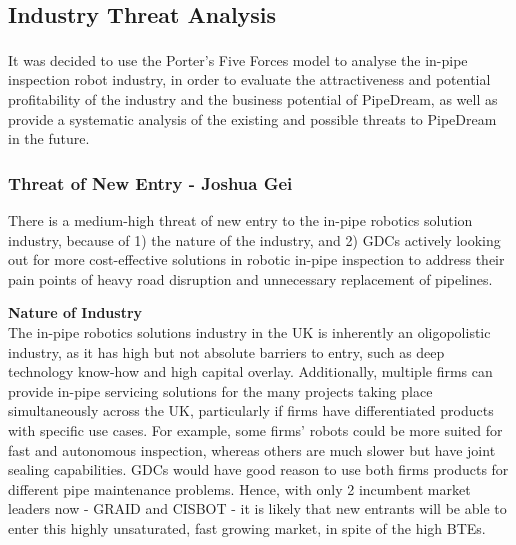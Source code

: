\documentclass[11pt]{article}		%
\newcommand{\supercite}[1]{\textsuperscript{\cite{#1}}}		%
\begin{document}
		\subsection{Industry Threat Analysis} \label{industryP5F}
			
			It was decided to use the Porter's Five Forces model\supercite{porter2008five} to analyse the in-pipe inspection robot industry, in order to evaluate the attractiveness and potential profitability of the industry and the business potential of PipeDream, as well as provide a systematic analysis of the existing and possible threats to PipeDream in the future.

			\subsubsection{Threat of New Entry - Joshua Gei}
			
			There is a medium-high threat of new entry to the in-pipe robotics solution industry, because of 1) the nature of the industry, and 2) GDCs actively looking out for more cost-effective solutions in robotic in-pipe inspection to address their pain points of heavy road disruption and unnecessary replacement of pipelines.
            
           \textbf{Nature of Industry} 
            \\The in-pipe robotics solutions industry in the UK is inherently an oligopolistic industry, as it has high but not absolute barriers to entry, such as deep technology know-how and high capital overlay. Additionally, multiple firms can provide in-pipe servicing solutions for the many projects taking place simultaneously across the UK, particularly if firms have differentiated products with specific use cases. For example, some firms’ robots could be more suited for fast and autonomous inspection, whereas others are much slower but have joint sealing capabilities. GDCs would have good reason to use both firms products for different pipe maintenance problems. Hence, with only 2 incumbent market leaders now - GRAID and CISBOT - it is likely that new entrants will be able to enter this highly unsaturated, fast growing market, in spite of the high BTEs.
         
\end{document}
